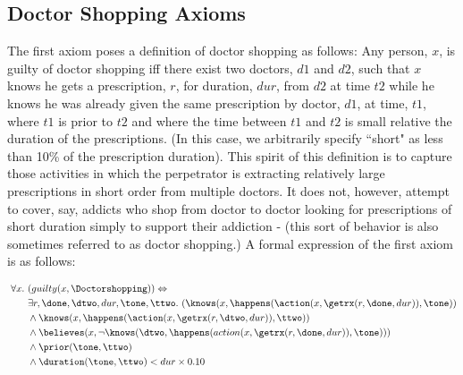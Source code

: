\subsection{Doctor Shopping Axioms}

The first axiom poses a definition of doctor shopping as follows:  Any person, $x$, is guilty of doctor shopping iff there exist two doctors, $d1$ and $d2$, such that $x$ knows he gets a prescription, $r$, for duration, $dur$, from $d2$ at time $t2$ while he knows he was already given the same prescription by doctor, $d1$, at time, $t1$, where $t1$ is prior to $t2$ and where the time between $t1$ and $t2$ is small relative the duration of the prescriptions.  (In this case, we arbitrarily specify ``short" as less than 10\% of the prescription duration).  This spirit of this definition is to capture those activities in which the perpetrator is extracting relatively large prescriptions in short order from multiple doctors.  It does not, however, attempt to cover, say, addicts who shop from doctor to doctor looking for prescriptions of short duration simply to support their addiction - (this sort of behavior is also sometimes referred to as doctor shopping.)  A formal expression of the first axiom is as follows:


\begin{footnotesize}
\begin{align*}
[A1] \ \forall x . \ &(guilty(x, \Doctorshopping)) \Leftrightarrow \\
	& \exists r, \done, \dtwo, dur, \tone, \ttwo . \ (\knows(x,\happens(\action(x, \getrx(r, \done, dur)), \tone)) \\
	& \wedge \knows(x,\happens(\action(x,\getrx(r,\dtwo,dur)),\ttwo)) \\
	& \wedge \believes(x,\neg\knows(\dtwo,\happens(action(x,\getrx(r,\done,dur)),\tone))) \\
	& \wedge \prior(\tone, \ttwo) \\
	& \wedge \duration(\tone, \ttwo) < dur \times 0.10
\end{align*}
\end{footnotesize}


